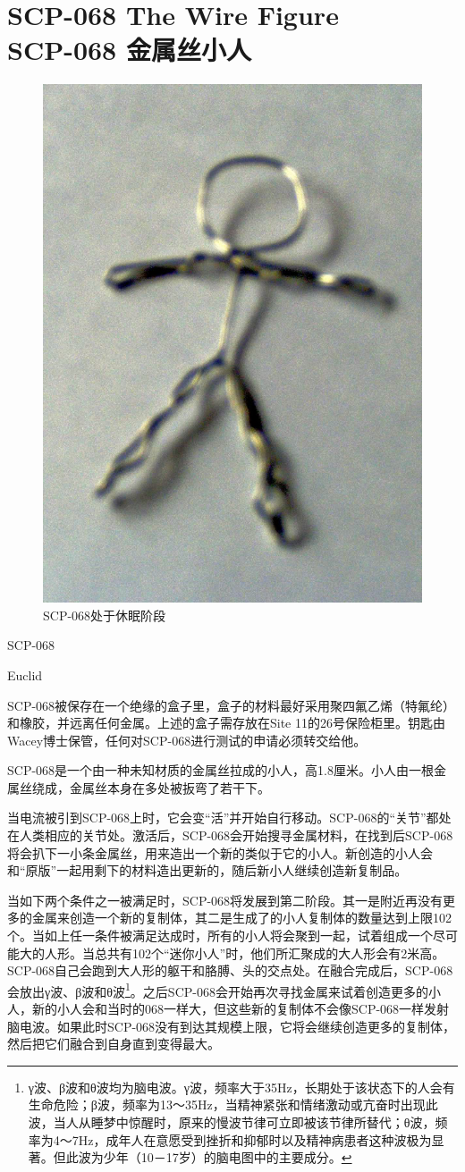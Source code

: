 \chapter[SCP-068 金属丝小人]{
    SCP-068 The Wire Figure\\
    SCP-068 金属丝小人
}

\label{chap:SCP-068}

\begin{figure}[H]
    \centering
    \includegraphics[width=0.4\linewidth]{images/SCP-068.jpg}
    \caption*{SCP-068处于休眠阶段}
\end{figure}

SCP-068

Euclid

SCP-068被保存在一个绝缘的盒子里，盒子的材料最好采用聚四氟乙烯（特氟纶）和橡胶，并远离任何金属。上述的盒子需存放在Site 11的26号保险柜里。钥匙由Wacey博士保管，任何对SCP-068进行测试的申请必须转交给他。

SCP-068是一个由一种未知材质的金属丝拉成的小人，高1.8厘米。小人由一根金属丝绕成，金属丝本身在多处被扳弯了若干下。

当电流被引到SCP-068上时，它会变“活”并开始自行移动。SCP-068的“关节”都处在人类相应的关节处。激活后，SCP-068会开始搜寻金属材料，在找到后SCP-068将会扒下一小条金属丝，用来造出一个新的类似于它的小人。新创造的小人会和“原版”一起用剩下的材料造出更新的，随后新小人继续创造新复制品。

当如下两个条件之一被满足时，SCP-068将发展到第二阶段。其一是附近再没有更多的金属来创造一个新的复制体，其二是生成了的小人复制体的数量达到上限102个。当如上任一条件被满足达成时，所有的小人将会聚到一起，试着组成一个尽可能大的人形。当总共有102个“迷你小人”时，他们所汇聚成的大人形会有2米高。SCP-068自己会跑到大人形的躯干和胳膊、头的交点处。在融合完成后，SCP-068会放出γ波、β波和θ波\footnote{γ波、β波和θ波均为脑电波。γ波，频率大于35Hz，长期处于该状态下的人会有生命危险；β波，频率为13～35Hz，当精神紧张和情绪激动或亢奋时出现此波，当人从睡梦中惊醒时，原来的慢波节律可立即被该节律所替代；θ波，频率为4～7Hz，成年人在意愿受到挫折和抑郁时以及精神病患者这种波极为显著。但此波为少年（10－17岁）的脑电图中的主要成分。}。之后SCP-068会开始再次寻找金属来试着创造更多的小人，新的小人会和当时的068一样大，但这些新的复制体不会像SCP-068一样发射脑电波。如果此时SCP-068没有到达其规模上限，它将会继续创造更多的复制体，然后把它们融合到自身直到变得最大。

